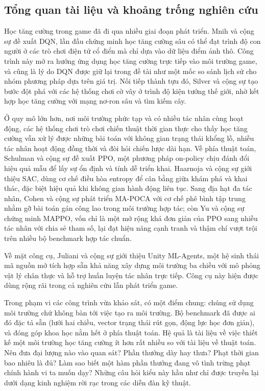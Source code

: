 \subsection{Tổng quan tài liệu và khoảng trống nghiên cứu}

\indent Học tăng cường trong game đã đi qua nhiều giai đoạn phát triển. Mnih và cộng sự
\cite{mnih2015humanlevel} đề xuất DQN, lần đầu chứng minh học tăng cường sâu có thể đạt
trình độ con người ở các trò chơi điện tử cổ điển mà chỉ dựa vào dữ liệu điểm ảnh thô.
Công trình này mở ra hướng ứng dụng học tăng cường trực tiếp vào môi trường game, và cũng
là lý do DQN được giữ lại trong đề tài như một mốc so sánh lịch sử cho nhóm phương pháp
dựa trên giá trị. Nối tiếp thành tựu đó, Silver và cộng sự \cite{silver2016mastering, silver2017mastering} tạo bước đột phá với các hệ thống chơi cờ vây ở trình độ kiện tướng
thế giới, nhờ kết hợp học tăng cường với mạng nơ-ron sâu và tìm kiếm cây.

\indent Ở quy mô lớn hơn, nơi môi trường phức tạp và có nhiều tác nhân cùng hoạt động,
các hệ thống chơi trò chơi chiến thuật thời gian thực \cite{openai2019dota, vinyals2019grandmaster} cho thấy học tăng cường vẫn xử lý được những bài toán với không
gian trạng thái khổng lồ, nhiều tác nhân hoạt động đồng thời và đòi hỏi chiến lược dài
hạn. Về phía thuật toán, Schulman và cộng sự \cite{schulman2017proximal} đề xuất PPO,
một phương pháp on-policy chịu đánh đổi hiệu quả mẫu để lấy sự ổn định và tính dễ triển
khai. Haarnoja và cộng sự \cite{haarnoja2018soft} giới thiệu SAC, dùng cơ chế điều hòa
entropy để cân bằng giữa khám phá và khai thác, đặc biệt hiệu quả khi không gian hành
động liên tục. Sang địa hạt đa tác nhân, Cohen và cộng sự \cite{cohen2022mapoca} phát
triển MA-POCA với cơ chế phê bình tập trung nhằm gỡ bài toán gán công lao trong môi
trường hợp tác; còn Yu và cộng sự \cite{yu2022surprising} chứng minh MAPPO, vốn chỉ là
một mở rộng khá đơn giản của PPO sang nhiều tác nhân với chia sẻ tham số, lại đạt hiệu
năng cạnh tranh và thậm chí vượt trội trên nhiều bộ benchmark hợp tác chuẩn.

\indent Về mặt công cụ, Juliani và cộng sự \cite{juliani2020unity} giới thiệu Unity
ML-Agents, một hệ sinh thái mã nguồn mở tích hợp sẵn khả năng xây dựng môi trường ba
chiều với mô phỏng vật lý chân thực và hỗ trợ huấn luyện tác nhân trực tiếp. Công cụ này
hiện được dùng rộng rãi trong cả nghiên cứu lẫn phát triển game.

\indent Trong phạm vi các công trình vừa khảo sát, có một điểm chung: chúng sử dụng môi
trường chứ không bàn tới việc tạo ra môi trường. Bộ benchmark đã được ai đó đặc tả sẵn (lưới
hai chiều, vector trạng thái rút gọn, động lực học đơn giản), và đóng góp khoa học
nằm hết ở phía thuật toán. Hệ quả là tài liệu về việc thiết kế một môi trường học
tăng cường ít hơn rất nhiều so với tài liệu về thuật toán. Nên đưa đại lượng nào
vào quan sát? Phần thưởng dày hay thưa? Phạt thời gian bao nhiêu là đủ? Làm sao biết một
hàm phần thưởng đang vô tình trừng phạt chính hành vi ta muốn dạy? Những câu hỏi kiểu này
hầu như chỉ được truyền lại dưới dạng kinh nghiệm rời rạc trong các diễn đàn kỹ thuật.

